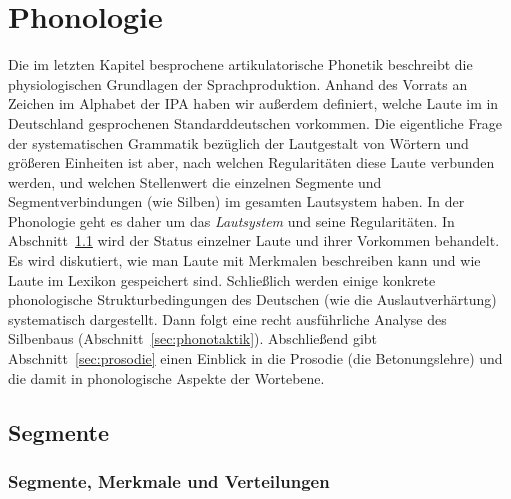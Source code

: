 \chapter{Phonologie}

\label{sec:phonologie}

Die im letzten Kapitel besprochene artikulatorische Phonetik beschreibt die physiologischen Grundlagen der Sprachproduktion.
Anhand des Vorrats an Zeichen im Alphabet der IPA haben wir außerdem definiert, welche Laute im in Deutschland gesprochenen Standarddeutschen vorkommen.
Die eigentliche Frage der systematischen Grammatik bezüglich der Lautgestalt von Wörtern und größeren Einheiten ist aber, nach welchen Regularitäten diese Laute verbunden werden, und welchen Stellenwert die einzelnen Segmente und Segmentverbindungen (wie \zB Silben) im gesamten Lautsystem haben.
In der Phonologie geht es daher um das \textit{Lautsystem} und seine Regularitäten.
In Abschnitt~\ref{sec:segmentalephol} wird der Status einzelner Laute und ihrer Vorkommen behandelt.
Es wird diskutiert, wie man Laute mit Merkmalen beschreiben kann und wie Laute im Lexikon gespeichert sind.
Schließlich werden einige konkrete phonologische Strukturbedingungen des Deutschen (wie die Auslautverhärtung) systematisch dargestellt.
Dann folgt eine recht ausführliche Analyse des Silbenbaus (Abschnitt~\ref{sec:phonotaktik}).
Abschließend gibt Abschnitt~\ref{sec:prosodie} einen Einblick in die Prosodie (die Betonungslehre) und die damit in phonologische Aspekte der Wortebene.





\section{Segmente}

\label{sec:segmentalephol}

\subsection{Segmente, Merkmale und Verteilungen}

\label{sec:segmenteverteilungen}
\label{sec:verteilungen}

